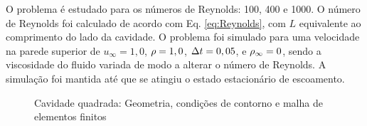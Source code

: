 \documentclass[tese_patricia]{subfiles}%
\begin{document}
O problema é estudado para os números de Reynolds: 100, 400 e 1000. O número de Reynolds foi calculado de acordo com Eq. \eqref{eq:Reynolds}, com $L$ equivalente ao comprimento do lado da cavidade. O problema foi simulado para uma velocidade na parede superior de $u_{\infty} = 1,0$, $\rho = 1,0$, $\Delta t = 0,05$, e $\rho_\infty = 0$, sendo a viscosidade do fluido variada de modo a alterar o número de Reynolds. A simulação foi mantida até que se atingiu o estado estacionário de escoamento. 

\begin{figure}[!htb]
	\centering
	 \quad
	\caption{Cavidade quadrada: Geometria, condições de contorno e malha de elementos finitos}
\end{figure}
\end{document}
